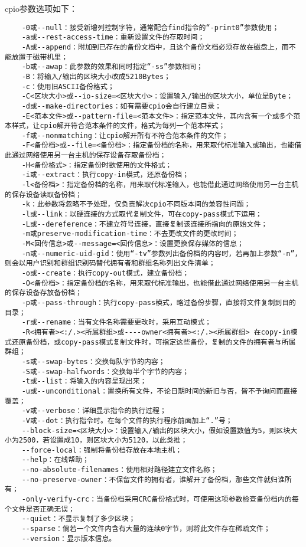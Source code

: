 \documentclass[a4paper,left=2.5cm,right=2.5cm,11pt]{article}
\begin{document}
	cpio参数选项如下：
	\begin{lstlisting}
	-0或--null：接受新增列控制字符，通常配合find指令的“-print0”参数使用； 
	-a或--rest-access-time：重新设置文件的存取时间； 
	-A或--append：附加到已存在的备份文档中，且这个备份文档必须存放在磁盘上，而不能放置于磁带机里； 
	-b或--awap：此参数的效果和同时指定“-ss”参数相同； 
	-B：将输入/输出的区块大小改成5210Bytes； 
	-c：使用旧ASCII备份格式； 
	-C<区块大小>或--io-size=<区块大小>：设置输入/输出的区块大小，单位是Byte； 
	-d或--make-directories：如有需要cpio会自行建立目录； 
	-E<范本文件>或--pattern-file=<范本文件>：指定范本文件，其内含有一个或多个范本样式，让cpio解开符合范本条件的文件，格式为每列一个范本样式； 
	-f或--nonmatching：让cpio解开所有不符合范本条件的文件； 
	-F<备份档>或--file=<备份档>：指定备份档的名称，用来取代标准输入或输出，也能借此通过网络使用另一台主机的保存设备存取备份档； 
	-H<备份格式>：指定备份时欲使用的文件格式； 
	-i或--extract：执行copy-in模式，还原备份档； 
	-l<备份档>：指定备份档的名称，用来取代标准输入，也能借此通过网络使用另一台主机的保存设备读取备份档； 
	-k：此参数将忽略不予处理，仅负责解决cpio不同版本间的兼容性问题； 
	-l或--link：以硬连接的方式取代复制文件，可在copy-pass模式下运用； 
	-L或--dereference：不建立符号连接，直接复制该连接所指向的原始文件； 
	-m或preserve-modification-time：不去更改文件的更改时间； 
	-M<回传信息>或--message=<回传信息>：设置更换保存媒体的信息； 
	-n或--numeric-uid-gid：使用“-tv”参数列出备份档的内容时，若再加上参数“-n”，则会以用户识别和群组识别码替代拥有者和群组名称列出文件清单； 
	-o或--create：执行copy-out模式，建立备份档； 
	-O<备份档>：指定备份档的名称，用来取代标准输出，也能借此通过网络使用另一台主机的保存设备存放备份档； 
	-p或--pass-through：执行copy-pass模式，略过备份步骤，直接将文件复制到目的目录； 
	-r或--rename：当有文件名称需要更改时，采用互动模式； 
	-R<拥有者><:/.><所属群组>或----owner<拥有者><:/.><所属群组> 在copy-in模式还原备份档，或copy-pass模式复制文件时，可指定这些备份，复制的文件的拥有者与所属群组； 
	-s或--swap-bytes：交换每队字节的内容； 
	-S或--swap-halfwords：交换每半个字节的内容； 
	-t或--list：将输入的内容呈现出来； 
	-u或--unconditional：置换所有文件，不论日期时间的新旧与否，皆不予询问而直接覆盖； 
	-v或--verbose：详细显示指令的执行过程； 
	-V或--dot：执行指令时。在每个文件的执行程序前面加上“.”号； 
	--block-size=<区块大小>：设置输入/输出的区块大小，假如设置数值为5，则区块大小为2500，若设置成10，则区块大小为5120，以此类推； 
	--force-local：强制将备份档存放在本地主机； 
	--help：在线帮助； 
	--no-absolute-filenames：使用相对路径建立文件名称； 
	--no-preserve-owner：不保留文件的拥有者，谁解开了备份档，那些文件就归谁所有； 
	-only-verify-crc：当备份档采用CRC备份格式时，可使用这项参数检查备份档内的每个文件是否正确无误； 
	--quiet：不显示复制了多少区块； 
	--sparse：倘若一个文件内含有大量的连续0字节，则将此文件存在稀疏文件； 
	--version：显示版本信息。
	\end{lstlisting}
\end{document}
